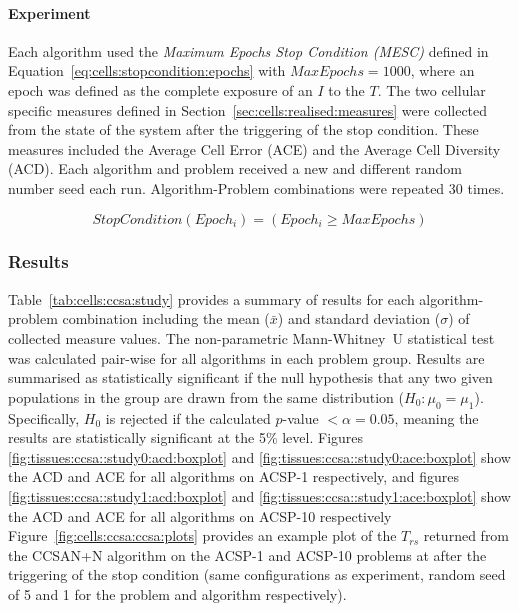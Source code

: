%
%
\paragraph{Experiment}
Each algorithm used the \emph{Maximum Epochs Stop Condition (MESC)} defined in Equation~\ref{eq:cells:stopcondition:epochs} with $MaxEpochs=1000$, where an epoch was defined as the complete exposure of an $I$ to the $T$. The two cellular specific measures defined in Section~\ref{sec:cells:realised:measures} were collected from the state of the system after the triggering of the stop condition. These measures included the Average Cell Error (ACE) and the Average Cell Diversity (ACD). Each algorithm and problem received a new and different random number seed each run. Algorithm-Problem combinations were repeated 30 times.

\begin{equation}	
	StopCondition(Epoch_i) = \left(Epoch_i \geq MaxEpochs\right)
	\label{eq:cells:stopcondition:epochs}
\end{equation}


%
%
\subsubsection{Results}
Table~\ref{tab:cells:ccsa:study} provides a summary of results for each algorithm-problem combination including the mean ($\bar{x}$) and standard deviation ($\sigma$) of collected measure values. The non-parametric Mann-Whitney~U statistical test was calculated pair-wise for all algorithms in each problem group. Results are summarised as statistically significant if the null hypothesis that any two given populations in the group are drawn from the same distribution ($H_0: \mu_0 = \mu_1$). Specifically, $H_0$ is rejected if the calculated $p$-value $< \alpha=0.05$, meaning the results are statistically significant at the 5\% level. 
Figures \ref{fig:tissues:ccsa::study0:acd:boxplot} and \ref{fig:tissues:ccsa::study0:ace:boxplot} show the ACD and ACE for all algorithms on ACSP-1 respectively, and figures \ref{fig:tissues:ccsa::study1:acd:boxplot} and \ref{fig:tissues:ccsa::study1:ace:boxplot} show the ACD and ACE for all algorithms on ACSP-10 respectively
Figure~\ref{fig:cells:ccsa:ccsa:plots} provides an example plot of the $T_{rs}$ returned from the CCSAN+N algorithm on the ACSP-1 and ACSP-10 problems at after the triggering of the stop condition (same configurations as experiment, random seed of 5 and 1 for the problem and algorithm respectively).


